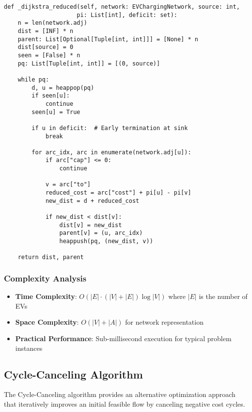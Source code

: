 \documentclass[12pt,a4paper]{article}
\begin{document}
\begin{lstlisting}[caption=Dijkstra with Reduced Costs]
def _dijkstra_reduced(self, network: EVChargingNetwork, source: int, 
                     pi: List[int], deficit: set):
    n = len(network.adj)
    dist = [INF] * n
    parent: List[Optional[Tuple[int, int]]] = [None] * n
    dist[source] = 0
    seen = [False] * n
    pq: List[Tuple[int, int]] = [(0, source)]
    
    while pq:
        d, u = heappop(pq)
        if seen[u]:
            continue
        seen[u] = True
        
        if u in deficit:  # Early termination at sink
            break
            
        for arc_idx, arc in enumerate(network.adj[u]):
            if arc["cap"] <= 0:
                continue
                
            v = arc["to"]
            reduced_cost = arc["cost"] + pi[u] - pi[v]
            new_dist = d + reduced_cost
            
            if new_dist < dist[v]:
                dist[v] = new_dist
                parent[v] = (u, arc_idx)
                heappush(pq, (new_dist, v))
    
    return dist, parent
\end{lstlisting}

\subsubsection{Complexity Analysis}

\begin{itemize}
\item \textbf{Time Complexity}: $O(|E| \cdot (|V| + |E|) \log |V|)$ where $|E|$ is the number of EVs
\item \textbf{Space Complexity}: $O(|V| + |A|)$ for network representation
\item \textbf{Practical Performance}: Sub-millisecond execution for typical problem instances
\end{itemize}

\subsection{Cycle-Canceling Algorithm}

The Cycle-Canceling algorithm provides an alternative optimization approach that iteratively improves an initial feasible flow by canceling negative cost cycles.
\end{document}
